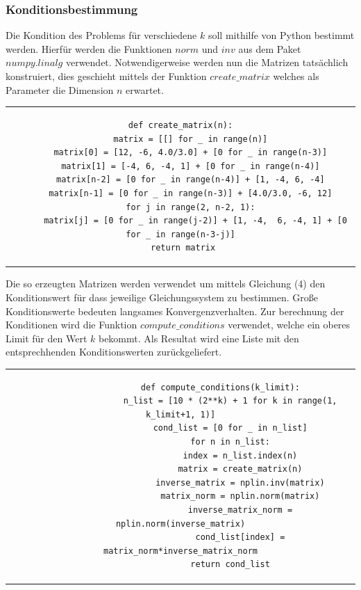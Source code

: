 \documentclass[12pt,titlepage]{article}
\begin{document}
			\subsubsection{Konditionsbestimmung}
				Die Kondition des Problems für verschiedene $k$ soll mithilfe von Python bestimmt werden. Hierfür werden die Funktionen $norm$ und $inv$ aus dem Paket $numpy.linalg$ verwendet.
				Notwendigerweise werden nun die Matrizen tatsächlich konstruiert, dies geschieht mittels der Funktion $create\_matrix$ welches als Parameter die Dimension $n$ erwartet.\newline
				\newline
				\begin{tabular}{c}
				\begin{lstlisting}
def create_matrix(n):
   	matrix = [[] for _ in range(n)]
    matrix[0] = [12, -6, 4.0/3.0] + [0 for _ in range(n-3)]
    matrix[1] = [-4, 6, -4, 1] + [0 for _ in range(n-4)]
    matrix[n-2] = [0 for _ in range(n-4)] + [1, -4, 6, -4]
    matrix[n-1] = [0 for _ in range(n-3)] + [4.0/3.0, -6, 12]
    for j in range(2, n-2, 1):
      matrix[j] = [0 for _ in range(j-2)] + [1, -4,  6, -4, 1] + [0 for _ in range(n-3-j)]
    return matrix	
	 			\end{lstlisting}
				\end{tabular}
				\newline \newline
				Die so erzeugten Matrizen werden verwendet um mittels Gleichung (4) den Konditionswert für dass jeweilige Gleichungssystem zu bestimmen.
				Große Konditionswerte bedeuten langsames Konvergenzverhalten.
				Zur berechnung der Konditionen wird die Funktion $compute\_conditions$ verwendet, welche ein oberes Limit für den Wert $k$ bekommt.
				Als Resultat wird eine Liste mit den entsprechhenden Konditionswerten zurückgeliefert. \newline \newline
				\begin{tabular}{c}
				\begin{lstlisting}
				def compute_conditions(k_limit):
    				n_list = [10 * (2**k) + 1 for k in range(1, k_limit+1, 1)]
    				cond_list = [0 for _ in n_list]
    				for n in n_list:
        				index = n_list.index(n)
       					matrix = create_matrix(n)
        				inverse_matrix = nplin.inv(matrix)
        				matrix_norm = nplin.norm(matrix)
        				inverse_matrix_norm = nplin.norm(inverse_matrix)
        				cond_list[index] = matrix_norm*inverse_matrix_norm
    				return cond_list
				\end{lstlisting}
				\end{tabular}
\end{document}
